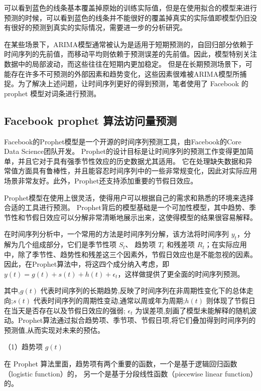 可以看到蓝色的线条基本覆盖掉原始的训练实际值，但是在使用拟合的模型来进行预测的时候，可以看到蓝色的线条并不能很好的覆盖掉真实的实际值即模型仍旧没有很好的预测到真实的实际情况，需要进一步的分析研究。

在某些场景下，ARIMA模型通常被认为是适用于短期预测的，自回归部分依赖于时间序列的先前值，而移动平均则依赖于预测误差的先前值。因此，模型特别关注数据中的局部波动，而这些往往在短期内更加稳定。
但是在长期预测场景下，可能存在许多不可预测的外部因素和趋势变化，这些因素很难被ARIMA模型所捕捉。为了解决上述问题，让时间序列更好的得到预测，笔者使用了 Facebook 的 prophet 模型对词条进行预测。

\subsection{Facebook prophet 算法访问量预测}

Facebook的Prophet模型是一个开源的时间序列预测工具，由Facebook的Core Data Science团队开发\cite{taylor2018forecasting}。
Prophet的设计目标是让时间序列的预测工作变得更加简单，并且它对于具有强季节性效应的历史数据尤其适用。
它在处理缺失数据和异常值方面具有鲁棒性，并且能容忍时间序列中的一些非常规变化，因此对实际应用场景非常友好。此外，Prophet还支持添加重要的节假日效应。

Prophet模型在使用上很灵活，使得用户可以根据自己的需求和熟悉的环境来选择合适的工具进行预测。
Prophet背后的模型基础是一个可加性模型，其中趋势、季节性和节假日效应可以分解非常清晰地展示出来，这使得模型的结果很容易解释。

在时间序列分析中，一个常用的方法是时间序列分解，该方法将时间序列 $y_{t}$，分解为几个组成部分，它们是季节性项 $S_{t}$、
趋势项 $T_{t}$ 和残差项 $R_{t}$；在实际应用中，除了季节性、趋势性和残差这三个因素外，节假日效应也是不能忽视的因素。
因此，在Prophet算法中，将这四个成分纳入考虑，即 $y(t) = g(t) + s(t) + h(t) + \epsilon_{t}$，这样做提供了更全面的时间序列预测。

其中,$g(t)$ 代表时间序列的长期趋势,反映了时间序列在非周期性变化下的总体走向;$s(t)$ 代表时间序列的周期性变动,通常以周或年为周期;$h(t)$ 则体现了节假日在当天是否存在以及节假日效应的强弱;
$\epsilon_{t}$ 为误差项,刻画了模型未能解释的随机波动。Prophet算法通过拟合趋势项、季节项、节假日项,将它们叠加得到时间序列的预测值,从而实现对未来的预估。

（1）趋势项 $g(t)$

在 Prophet 算法里面，趋势项有两个重要的函数，一个是基于逻辑回归函数（logistic function）的，
另一个是基于分段线性函数（piecewise linear function）的。

